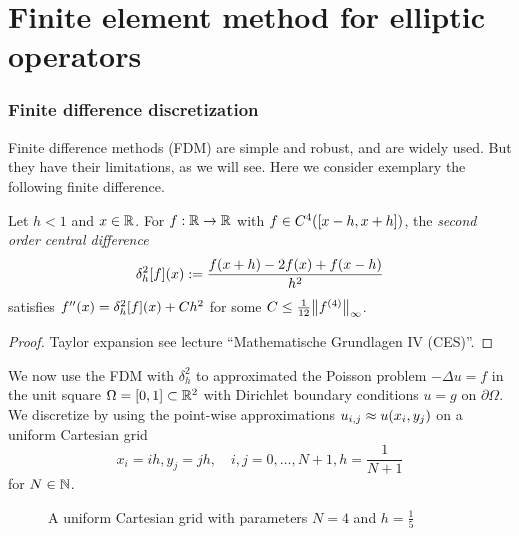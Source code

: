 \part{Finite element method for elliptic operators}


\section{Finite difference discretization}

Finite difference methods (FDM) are simple and robust, and are widely used.
But they have their limitations, as we will see.
Here we consider exemplary the following finite difference.

\begin{theorem}
	Let \(h < 1\) and \(x \in \R\).
	For \(f: \R \to \R\) with \(f \in C^4\parentheses*{\brackets*{x - h, x + h}}\), the \emph{second order central difference}
	\[
		\delta_h^2\brackets*{f}\parentheses*{x} := \frac{f\parentheses*{x + h} - 2f\parentheses*{x} + f\parentheses*{x - h}}{h^2}
	\]
	satisfies \(f''\parentheses*{x} = \delta_h^2\brackets*{f}\parentheses*{x} + Ch^2\) for some \(C \le \frac{1}{12}\norm*{f^{\parentheses*{4}}}_\infty\).
\end{theorem}

\begin{proof}
	Taylor expansion see lecture ``Mathematische Grundlagen IV (CES)''.
\end{proof}

We now use the FDM with \(\delta_h^2\) to approximated the Poisson problem \(-\Delta u = f\) in the unit square \(\Omega = \brackets*{0, 1} \subset \R^2\) with Dirichlet boundary conditions \(u = g\) on \(\partial\Omega\).
We discretize by using the point-wise approximations \(u_{i, j} \approx u\parentheses*{x_i, y_j}\) on a uniform Cartesian grid
\[
	x_i = ih, y_j = jh, \quad i, j = 0, \ldots, N + 1, h = \frac{1}{N + 1}
\]
for \(N \in \N\).

\begin{figure}[h]
	\centering
	\caption{A uniform Cartesian grid with parameters \(N = 4\) and \(h = \frac{1}{5}\)}
	\label{fig:1-1}
\end{figure}

